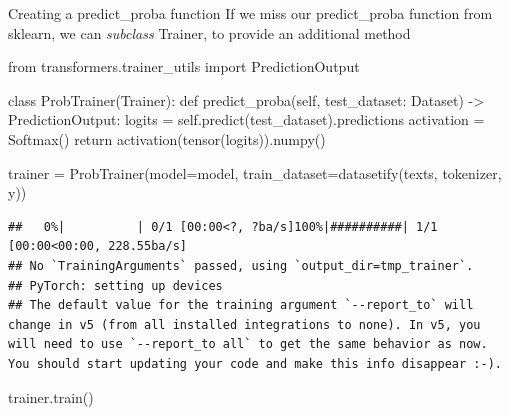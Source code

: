 \documentclass[
  10pt,
  ignorenonframetext,
  aspectratio=169]{beamer}
\newenvironment{Shaded}{\begin{snugshade}}{\end{snugshade}}
\newcommand{\ControlFlowTok}[1]{\textcolor[rgb]{0.94,0.87,0.69}{#1}}
\newcommand{\ImportTok}[1]{\textcolor[rgb]{0.80,0.80,0.80}{#1}}
\newcommand{\KeywordTok}[1]{\textcolor[rgb]{0.94,0.87,0.69}{#1}}
\newcommand{\NormalTok}[1]{\textcolor[rgb]{0.80,0.80,0.80}{#1}}
\newcommand{\OperatorTok}[1]{\textcolor[rgb]{0.94,0.94,0.82}{#1}}
\newcommand{\VariableTok}[1]{\textcolor[rgb]{0.80,0.80,0.80}{#1}}
\begin{document}
\begin{frame}[fragile]{Creating a predict\_proba function}
\protect\hypertarget{creating-a-predict_proba-function}{}
If we miss our predict\_proba function from sklearn, we can
\emph{subclass} Trainer, to provide an additional method

\medskip
\scriptsize

\begin{Shaded}
\begin{Highlighting}[]
\ImportTok{from}\NormalTok{ transformers.trainer\_utils }\ImportTok{import}\NormalTok{ PredictionOutput}

\KeywordTok{class}\NormalTok{ ProbTrainer(Trainer):}
    \KeywordTok{def}\NormalTok{ predict\_proba(}\VariableTok{self}\NormalTok{, test\_dataset: Dataset) }\OperatorTok{{-}\textgreater{}}\NormalTok{ PredictionOutput:}
\NormalTok{        logits }\OperatorTok{=} \VariableTok{self}\NormalTok{.predict(test\_dataset).predictions}
\NormalTok{        activation }\OperatorTok{=}\NormalTok{ Softmax()}
        \ControlFlowTok{return}\NormalTok{ activation(tensor(logits)).numpy()}


\NormalTok{trainer }\OperatorTok{=}\NormalTok{ ProbTrainer(model}\OperatorTok{=}\NormalTok{model, train\_dataset}\OperatorTok{=}\NormalTok{datasetify(texts, tokenizer, y))}
\end{Highlighting}
\end{Shaded}

\begin{verbatim}
##   0%|          | 0/1 [00:00<?, ?ba/s]100%|##########| 1/1 [00:00<00:00, 228.55ba/s]
## No `TrainingArguments` passed, using `output_dir=tmp_trainer`.
## PyTorch: setting up devices
## The default value for the training argument `--report_to` will change in v5 (from all installed integrations to none). In v5, you will need to use `--report_to all` to get the same behavior as now. You should start updating your code and make this info disappear :-).
\end{verbatim}

\begin{Shaded}
\begin{Highlighting}[]
\NormalTok{trainer.train()}
\end{Highlighting}
\end{Shaded}


\end{frame}
\end{document}

